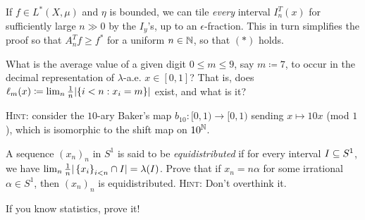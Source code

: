 \documentclass[reqno, twoside]{article}
\begin{document}
    \begin{remark}
        If $f\in L^\ast(X,\mu)$ and $\eta$ is bounded, we can tile \textit{every} interval $I_n^T(x)$ for sufficiently large $n\gg0$ by the $I_y$'s, up to an $\epsilon$-fraction. This in turn simplifies the proof so that $A_n^Tf\geq f^\ast$ for a uniform $n\in\mathbb{N}$, so that $(\ast)$ holds.
    \end{remark}

    \begin{exercise}
        What is the average value of a given digit $0\leq m\leq9$, say $m\coloneqq7$, to occur in the decimal representation of $\lambda$-a.e. $x\in[0,1]$? That is, does $\ell_m(x)\coloneqq\lim_n\frac{1}{n}|\{i<n: x_i=m\}|$ exist, and what is it?

        \textsc{Hint:} consider the $10$-ary Baker's map $b_{10}:[0,1)\to[0,1)$  sending $x\mapsto 10x$ (mod $1$), which is isomorphic to the shift map on $10^{\mathbb{N}}$.
    \end{exercise}

    \begin{exercise}
        A sequence $(x_n)_n$ in $S^1$ is said to be \textit{equidistributed} if for every interval $I\subseteq S^1$, we have $\lim_n\frac{1}{n}|\left\{x_i\right\}_{i<n}\cap I|=\lambda(I)$. Prove that if $x_n=n\alpha$ for some irrational $\alpha\in S^1$, then $(x_n)_n$ is equidistributed. \textsc{Hint:} Don't overthink it.
    \end{exercise}

    \begin{exercise}
        If you know statistics, prove it!
    \end{exercise}
\end{document}

